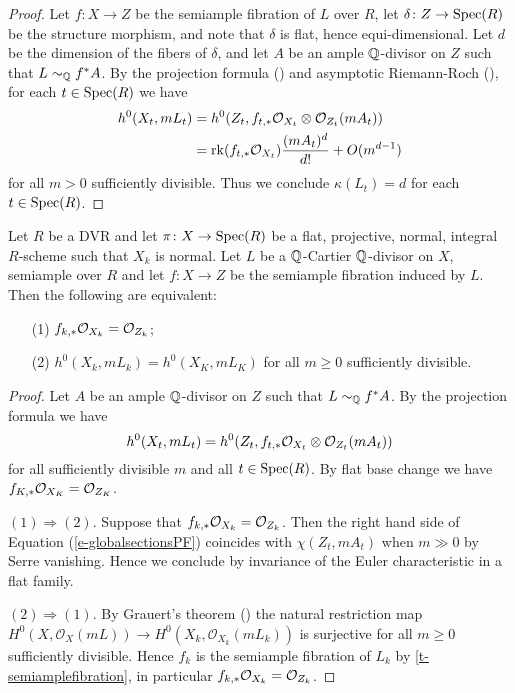 	\begin{proof}
	Let $f\colon X \to Z$ be the semiample fibration of $L$ over $R$, let $\delta\colon Z\to\operatorname{Spec}(R)$ be the structure morphism, and note that $\delta$ is flat, hence equi-dimensional. Let $d$ be the dimension of the fibers of $\delta$, and let $A$ be an ample $\mathbb{Q}$-divisor on $Z$ such that $L\sim_{\mathbb{Q}}f^\ast A$. By the projection formula (\cite[\href{https://stacks.math.columbia.edu/tag/01E8}{Tag 01E8}]{stacks-project})  and asymptotic Riemann-Roch (\cite[Theorem VI.2.15]{k-rat-curves}), for each $t \in \operatorname{Spec}(R)$ we have
	\begin{equation*}
	\begin{split}
	h^0(X_t,mL_t)&=h^0(Z_t,f_{t,*} \mathcal{O}_{X_t}\otimes\mathcal{O}_{Z_t}(mA_t))\\
	&=\mathrm{rk} (f_{t,*} \mathcal{O}_{X_t})\frac{(mA_t)^d}{d!}+O(m^{d-1})
	\end{split}
	\end{equation*}
	for all $m> 0$ sufficiently divisible. Thus we conclude $\kappa(L_t)=d$ for each $t \in \operatorname{Spec}(R)$.
	\end{proof}
	
	
	\begin{lemma}\label{l-stein-invariance}
	Let $R$ be a DVR and let $\pi \colon X \to \operatorname{Spec}(R)$ be a flat, projective, normal, integral $R$-scheme such that $X_k$ is normal. 
	Let $L$ be a $\mathbb{Q}$-Cartier $\mathbb{Q}$-divisor on $X$, semiample over $R$ and let $f \colon X \to Z$ be the semiample fibration induced by $L$.
	Then the following are equivalent:
	\begin{enumerate}
		\item[(1)] $f_{k,*} \mathcal{O}_{X_k} = \mathcal{O}_{Z_k}$;
		\item[(2)] $h^0(X_k, mL_k)=h^0(X_K, mL_K)$ for all $m\geq 0$ sufficiently divisible.
	\end{enumerate}
\end{lemma}

\begin{proof}
	Let $A$ be an ample $\mathbb{Q}$-divisor on $Z$ such that $L \sim_{\mathbb{Q}}f^*A$. 
	By the projection formula we have 
	\begin{equation}\label{e-globalsectionsPF}
	h^0(X_t,mL_t)=h^0(Z_t,f_{t,\ast}\mathcal{O}_{X_t}\otimes\mathcal{O}_{Z_t}(mA_t))
	\end{equation}
	for all sufficiently divisible $m$ and all $t\in \operatorname{Spec} (R)$. By flat base change we have $f_{K,\ast}\mathcal{O}_{X_K}=\mathcal{O}_{Z_K}$.
	
	$(1) \Rightarrow (2)$. Suppose that $f_{k,\ast}\mathcal{O}_{X_k}=\mathcal{O}_{Z_k}$. Then the right hand side of Equation (\ref{e-globalsectionsPF}) coincides with $\chi(Z_t,mA_t)$ when $m\gg 0$ by Serre vanishing. Hence we conclude by invariance of the Euler characteristic in a flat family.
	
	$(2) \Rightarrow (1)$. By Grauert's theorem (\cite[Corollary III.12.9]{Ha77}) the natural restriction map
	$H^0(X,\mathcal{O}_X(mL))\to H^0(X_k,\mathcal{O}_{X_k}(mL_k))$
	is surjective for all $m \geq 0$ sufficiently divisible. Hence $f_k$ is the semiample fibration of $L_k$ by \autoref{t-semiamplefibration}, in particular $f_{k,\ast}\mathcal{O}_{X_k}=\mathcal{O}_{Z_k}$. 
\end{proof}
	

